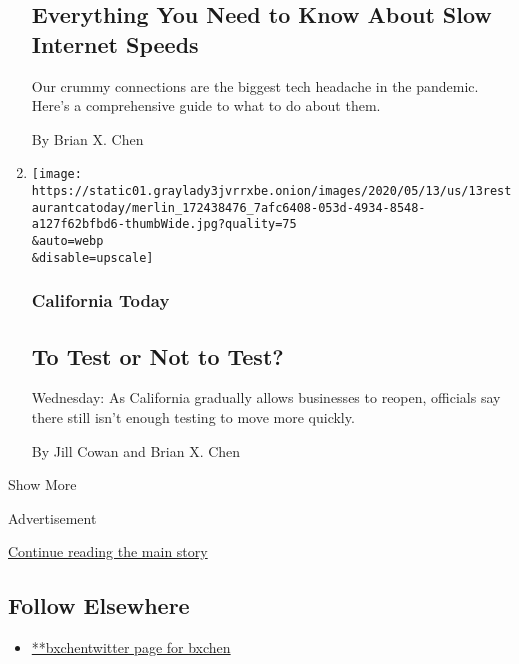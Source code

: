 \begin{enumerate}
  \hypertarget{everything-you-need-to-know-about-slow-internet-speeds}{%
  \subsection{Everything You Need to Know About Slow Internet
  Speeds}\label{everything-you-need-to-know-about-slow-internet-speeds}}

  Our crummy connections are the biggest tech headache in the pandemic.
  Here's a comprehensive guide to what to do about them.

  By Brian X. Chen
\item
  \href{/2020/05/13/us/california-covid-testing-reopening.html}{}

  \texttt{[image: https://static01.graylady3jvrrxbe.onion/images/2020/05/13/us/13restaurantcatoday/merlin\_172438476\_7afc6408-053d-4934-8548-a127f62bfbd6-thumbWide.jpg?quality=75\\\&auto=webp\\\&disable=upscale]}

  \hypertarget{california-today}{%
  \subsubsection{California Today}\label{california-today}}

  \hypertarget{to-test-or-not-to-test}{%
  \subsection{To Test or Not to Test?}\label{to-test-or-not-to-test}}

  Wednesday: As California gradually allows businesses to reopen,
  officials say there still isn't enough testing to move more quickly.

  By Jill Cowan and Brian X. Chen
\end{enumerate}

Show More

Advertisement

\protect\hyperlink{after-mid2}{Continue reading the main story}

\hypertarget{follow-elsewhere}{%
\subsection{Follow Elsewhere}\label{follow-elsewhere}}

\begin{itemize}
\tightlist
\item
  \href{https://twitter.com/bxchen}{**bxchentwitter page for bxchen}
\end{itemize}

